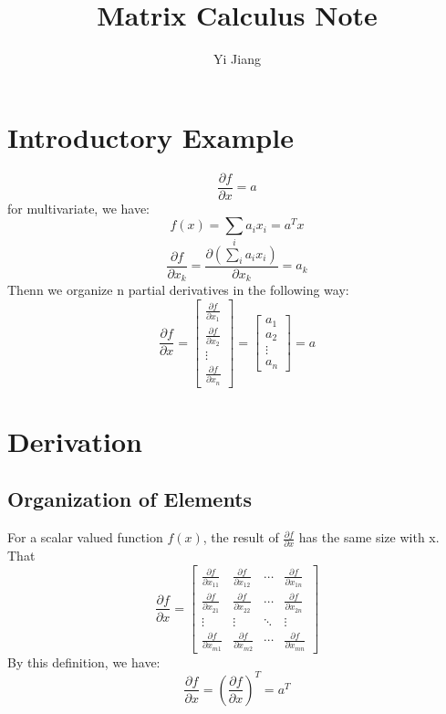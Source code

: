 \documentclass{article}
\title{Matrix Calculus Note}
\author{Yi Jiang}
\begin{document}
    \maketitle
    \newtheorem{theorem}{Theorem}

\section{Introductory Example}
\begin{equation}
    \frac{\partial f}{\partial x} = a
\end{equation}
for multivariate, we have:
$$ f(x) = \sum_i a_i x_i = a^T x $$
$$ \frac{\partial f }{\partial x_k} = \frac{\partial(\sum_i a_i x_i)}{\partial x_k } = a_k $$
Thenn we organize n partial derivatives in the following way:
\begin{equation}
    \frac{\partial f }{\partial x } = 
    \begin{bmatrix}
        \frac{\partial f}{\partial x_1 } \\
        \frac{\partial f}{\partial x_2} \\
        \vdots \\
        \frac{\partial f}{\partial x_n} 
    \end{bmatrix}
    = \begin{bmatrix}
        a_1 \\
        a_2 \\
        \vdots \\
        a_n
    \end{bmatrix}
    = a
\end{equation}


\section{Derivation}

\subsection{Organization of Elements}

For a scalar valued function $f(x)$, the result of $\frac{\partial f}{\partial x} $ has the same size with x. That 
\begin{equation}
    \frac{\partial f}{\partial x} =
    \begin{bmatrix}
        \frac{\partial f}{\partial x_{11}} & \frac{\partial f}{\partial x_{12}} & \cdots & \frac{\partial f}{\partial x_{1n}} \\
        \frac{\partial f}{\partial x_{21}} & \frac{\partial f}{\partial x_{22}} & \cdots & \frac{\partial f}{\partial x_{2n}} \\
        \vdots & \vdots & \ddots & \vdots \\
        \frac{\partial f}{\partial x_{m1}} & \frac{\partial f}{\partial x_{m2}} & \cdots & \frac{\partial f}{\partial x_{mn}}
    \end{bmatrix}
\end{equation}
By this definition, we have:
$$ \frac{\partial f}{\partial x} = ( \frac{\partial f}{\partial x})^T = a^T $$
\end{document}
